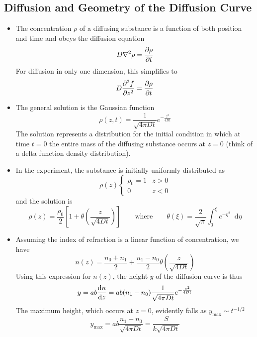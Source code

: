 \documentclass[11pt, a4paper]{article}
\newcommand{\diff}{\mathop{}\!\mathrm{d}} %
\newcommand{\eqtext}[1]{\qquad \text{#1} \qquad}
\begin{document}
\subsection{Diffusion and Geometry of the Diffusion Curve} \label{diftek:ss:diffusion}
\begin{itemize}
	\item The concentration $ \rho $ of a diffusing substance is a function of both position and time and obeys the diffusion equation 
	\begin{equation*}
		D \nabla^{2} \rho = \pdv{\rho}{t}
	\end{equation*}
	For diffusion in only one dimension, this simplifies to
	\begin{equation*}
		D \pdv[2]{f}{z} = \pdv{\rho}{t}
	\end{equation*}
	
	\item The general solution is the Gaussian function 
	\begin{equation*}
		\rho(z, t) = \frac{1}{\sqrt{4 \pi D t}}e^{-\frac{z^{2}}{4Dt}}
	\end{equation*}
	The solution represents a distribution for the initial condition in which at time $ t = 0 $ the entire mass of the diffusing substance occurs at $ z = 0 $ (think of a delta function density distribution).
	
	\item In the experiment, the substance is initially uniformly distributed as
	\begin{equation*}
		\rho(z)
		\begin{cases}
			\rho_{0} = 1 & z > 0\\
			0 & z < 0
		\end{cases}
	\end{equation*}
	and the solution is
	\begin{equation*}
		\rho(z) = \frac{\rho_{0}}{2}\left[1 + \theta\left(\frac{z}{\sqrt{4Dt}} \right) \right]  \eqtext{where} \theta(\xi) = \frac{2}{\sqrt{\pi}} \int_{0}^{\xi} e^{-\eta^{2}}\diff \eta
	\end{equation*}
	
	\item Assuming the index of refraction is a linear function of concentration, we have
	\begin{equation*}
		n(z) = \frac{n_{0} + n_{1}}{2} + \frac{n_{1} - n_{0}}{2} \theta\left(\frac{z}{\sqrt{4Dt}} \right)
	\end{equation*}
	Using this expression for $ n(z) $, the height $ y $ of the diffusion curve is thus
	\begin{equation*}
		y = ab \dv{n}{z} = ab (n_{1}- n_{0}) \frac{1}{\sqrt{4 \pi D t}}e^{-\frac{z^{2}}{4Dt}}
	\end{equation*}
	The maximum height, which occurs at $ z = 0 $, evidently falls as $ y_{\text{max}} \sim t^{-1/2} $
	\begin{equation*}
		y_{\text{max}} = ab \frac{n_{1}-n_{0}}{\sqrt{4\pi D t}} = \frac{S}{k\sqrt{4\pi D t}}
	\end{equation*}
	

\end{itemize}
\end{document}

